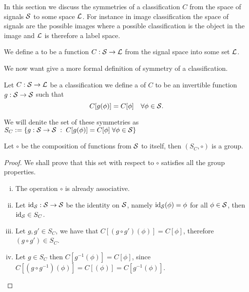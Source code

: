 \documentclass[../3.tex]{subfiles}
\begin{document}
   In this section we discuss the symmetries of a classification $C$ from the space of signals $\mathcal{S}$ to some space $\mathcal{L}$.
   For instance in image classification the space of signals are the possible images where a possible classification is the object in the image and 
   $\mathcal{L}$ is therefore a label space.

    \begin{defn}
        We define a  to be a function $C : \mathcal{S} \to \mathcal{L}$ from the signal space into some set $\mathcal{L}$.
    \end{defn}

   We now want give a more formal definition of symmetry of a classification.

    \begin{defn}
        Let $C : \mathcal{S} \to \mathcal{L}$ be a classification we define a  of $C$ to be an invertible function
        $g : \mathcal{S} \to \mathcal{S}$ such that 
        \[ C[g(\phi)] = C[\phi] \quad \forall \phi \in \mathcal{S}. \]
    \end{defn}

    We will denite the set of these symmetries as $S_C := \{ g : \mathcal{S} \to \mathcal{S} \; : \; C[g(\phi)] = C[\phi] \;  \forall \phi \in \mathcal{S}\}$

    \begin{prop}
        Let $\circ$ be the composition of functions from $\mathcal{S}$ to itself, then $(S_C, \circ)$ is a group.
    \end{prop} 
    \begin{proof}
        We shall prove that this set with respect to $\circ$ satisfies all the group properties.
        \begin{enumerate}[(i)]
            \item The operation $\circ$ is already associative.
            \item Let $\text{id}_{\mathcal{S}} : \mathcal{S} \to \mathcal{S}$ be the identity on $\mathcal{S}$, namely $\text{id}_{\mathcal{S}}(\phi) = \phi$ for all $\phi \in \mathcal{S}$,
                then $\text{id}_{\mathcal{S}} \in S_C$.
            \item Let $g,g' \in S_C$, we have that $C[(g\circ g')(\phi)] = C[\phi]$, therefore $(g \circ g') \in S_C$.
            \item Let $g \in S_C$ then $C[g^{-1}(\phi)] = C[\phi]$, since $C[(g \circ g^{-1})(\phi)] = C[(\phi)] = C[g^{-1}(\phi)]$. \qedhere
        \end{enumerate}
    \end{proof}
\end{document}
